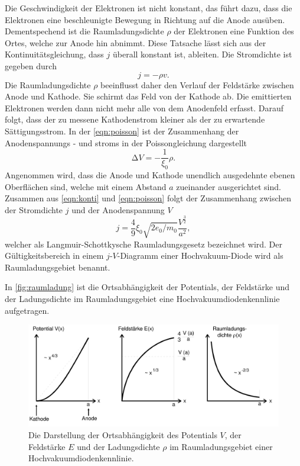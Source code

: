 Die Geschwindigkeit der Elektronen ist nicht konstant, das führt dazu, dass die Elektronen
eine beschleunigte Bewegung in Richtung auf die Anode ausüben. Dementspechend ist die Raumladungsdichte $\rho$
der Elektronen eine Funktion des Ortes, welche zur Anode hin abnimmt.  Diese Tatsache lässt sich aus der Kontinuitätsgleichung, dass $j$ überall konstant ist,
ableiten.
Die Stromdichte ist gegeben durch
\begin{equation}
    j = - \rho v .
\label{eqn:konti}
\end{equation}
Die Raumladungsdichte $\rho$ beeinflusst daher den Verlauf der Feldstärke zwischen Anode und Kathode.
Sie schirmt das Feld von der Kathode ab. Die emittierten Elektronen werden dann nicht mehr alle von dem
Anodenfeld erfasst. Darauf folgt, dass der zu messene Kathodenstrom kleiner als der zu erwartende Sättigungsstrom.
In der \autoref{eqn:poisson} ist der Zusammenhang der Anodenspannungs - und stroms in der Poissongleichung dargestellt
\begin{equation}
    \increment V = - \frac{1}{\xi_0}\rho .
    \label{eqn:poisson}
\end{equation} 
Angenommen wird, dass die Anode und Kathode unendlich ausgedehnte ebenen Oberflächen sind, welche
mit einem Abstand $a$ zueinander ausgerichtet sind.
Zusammen aus \autoref{eqn:konti} und \autoref{eqn:poisson} folgt der Zusammenhang
zwischen der Stromdichte $j$ und der Anodenspannung $V$
\begin{equation}
    j = \frac{4}{9} \xi_0 \sqrt{2 e_0/m_0} \frac{V^{\frac{3}{2}}}{a^2} ,
\label{eqn:langmuir}
\end{equation}
welcher als Langmuir-Schottkysche Raumladungsgesetz bezeichnet wird. Der Gültigkeitsbereich 
in einem $j$-$V$-Diagramm einer Hochvakuum-Diode wird als Raumladungsgebiet benannt.

In \autoref{fig:raumladung} ist die Ortsabhängigkeit der Potentials, der Feldstärke und der Ladungsdichte im Raumladungsgebiet
eine Hochvakuumdiodenkennlinie aufgetragen.

\begin{figure}[H]
    \centering
    \includegraphics[width=0.5\linewidth]{data/raumladung.png}
    \caption{Die Darstellung der Ortsabhängigkeit des Potentials $V$, der Feldstärke $E$ und der Ladungsdichte $\rho$ im
    Raumladungsgebiet einer Hochvakuumdiodenkennlinie.\cite{elektron}}
    \label{fig:raumladung}
\end{figure}

